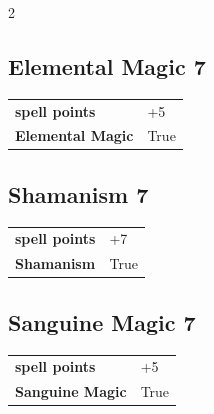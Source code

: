\begin{multicols}{2}
\begin{tcolorbox}
    \subsection*{Elemental Magic \hfill \small{7 }}
    \tcblower




\begin{tabular}{@{}ll@{}}
    \textbf{spell points} & +5\\
    \textbf{Elemental Magic} & True\\
\end{tabular}


\end{tcolorbox}

\begin{tcolorbox}
    \subsection*{Shamanism \hfill \small{7 }}
    \tcblower




\begin{tabular}{@{}ll@{}}
    \textbf{spell points} & +7\\
    \textbf{Shamanism} & True\\
\end{tabular}


\end{tcolorbox}

\begin{tcolorbox}
    \subsection*{Sanguine Magic \hfill \small{7 }}
    \tcblower




\begin{tabular}{@{}ll@{}}
    \textbf{spell points} & +5\\
    \textbf{Sanguine Magic} & True\\
\end{tabular}


\end{tcolorbox}
\end{multicols}
